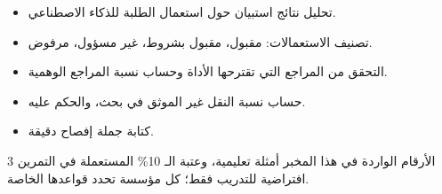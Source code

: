 \documentclass[a4paper]{article}
\begin{document}

\begin{itemize}
    \item تحليل نتائج استبيان حول استعمال الطلبة للذكاء الاصطناعي.
    \item تصنيف الاستعمالات: مقبول، مقبول بشروط، غير مسؤول، مرفوض.
    \item التحقق من المراجع التي تقترحها الأداة وحساب نسبة المراجع الوهمية.
    \item حساب نسبة النقل غير الموثق في بحث، والحكم عليه.
    \item كتابة جملة إفصاح دقيقة.
\end{itemize}

\begin{tanbih}
    الأرقام الواردة في هذا المخبر أمثلة تعليمية، وعتبة الـ 10\% المستعملة
    في التمرين 3 افتراضية للتدريب فقط؛ كل مؤسسة تحدد قواعدها الخاصة.
\end{tanbih}

\nisba

\end{document}
